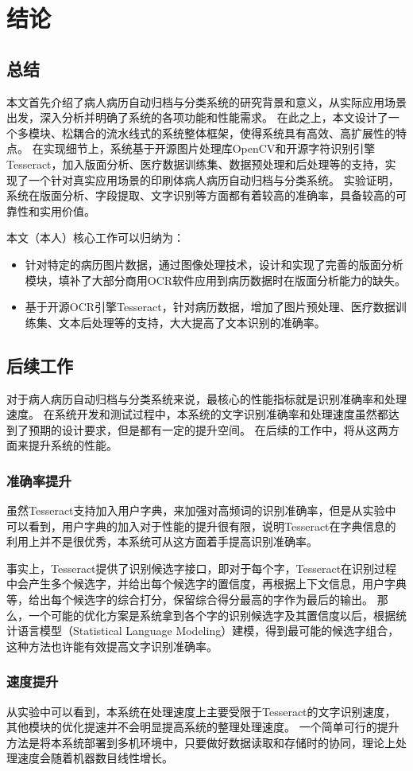 \chapter{结论}
\label{chap:conclusion}
\section*{总结}
本文首先介绍了病人病历自动归档与分类系统的研究背景和意义，从实际应用场景出发，深入分析并明确了系统的各项功能和性能需求。
在此之上，本文设计了一个多模块、松耦合的流水线式的系统整体框架，使得系统具有高效、高扩展性的特点。
在实现细节上，系统基于开源图片处理库OpenCV和开源字符识别引擎Tesseract，加入版面分析、医疗数据训练集、数据预处理和后处理等的支持，实现了一个针对真实应用场景的印刷体病人病历自动归档与分类系统。
实验证明，系统在版面分析、字段提取、文字识别等方面都有着较高的准确率，具备较高的可靠性和实用价值。

本文（本人）核心工作可以归纳为：
\begin{itemize}
  \item 针对特定的病历图片数据，通过图像处理技术，设计和实现了完善的版面分析模块，填补了大部分商用OCR软件应用到病历数据时在版面分析能力的缺失。
  \item 基于开源OCR引擎Tesseract，针对病历数据，增加了图片预处理、医疗数据训练集、文本后处理等的支持，大大提高了文本识别的准确率。
\end{itemize}

\section*{后续工作}
对于病人病历自动归档与分类系统来说，最核心的性能指标就是识别准确率和处理速度。
在系统开发和测试过程中，本系统的文字识别准确率和处理速度虽然都达到了预期的设计要求，但是都有一定的提升空间。
在后续的工作中，将从这两方面来提升系统的性能。
\subsection*{准确率提升}
虽然Tesseract支持加入用户字典，来加强对高频词的识别准确率，但是从实验中可以看到，用户字典的加入对于性能的提升很有限，说明Tesseract在字典信息的利用上并不是很优秀，本系统可从这方面着手提高识别准确率。

事实上，Tesseract提供了识别候选字接口，即对于每个字，Tesseract在识别过程中会产生多个候选字，并给出每个候选字的置信度，再根据上下文信息，用户字典等，给出每个候选字的综合打分，保留综合得分最高的字作为最后的输出。
那么，一个可能的优化方案是系统拿到各个字的识别候选字及其置信度以后，根据统计语言模型（Statistical Language Modeling）\citep{brown1990statistical}建模，得到最可能的候选字组合，这种方法也许能有效提高文字识别准确率。
\subsection*{速度提升}
从实验中可以看到，本系统在处理速度上主要受限于Tesseract的文字识别速度，其他模块的优化提速并不会明显提高系统的整理处理速度。
一个简单可行的提升方法是将本系统部署到多机环境中，只要做好数据读取和存储时的协同，理论上处理速度会随着机器数目线性增长。
